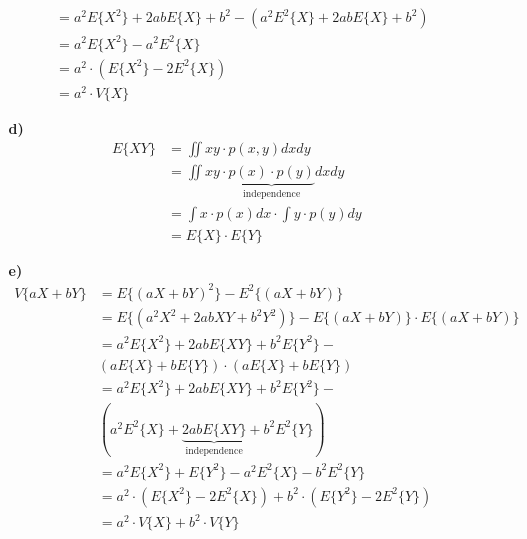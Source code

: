\documentclass[a4paper,11pt]{article}
\begin{document}
\begin{enumerate}
\begin{enumerate}
\begin{align*}
		&= a^2E\lbrace X^2 \rbrace + 2abE\lbrace X \rbrace + b^2 - (a^2E^2\lbrace X \rbrace + 2abE\lbrace X \rbrace + b^2) \\
		&= a^2E\lbrace X^2 \rbrace - a^2E^2\lbrace X \rbrace \\
		&= a^2 \cdot (E\lbrace X^2 \rbrace - 2E^2\lbrace X \rbrace) \\
		&= a^2 \cdot V\lbrace X \rbrace
		\end{align*}
		\item[\textbf{d)}]
		\begin{align*}
		E\lbrace XY \rbrace &= \iint xy \cdot p(x,y) dxdy \\
		&= \iint xy \cdot \underbrace{p(x) \cdot p(y)}_{\text{independence}} dxdy \\
		&= \int x \cdot p(x) dx \cdot \int y \cdot p(y) dy \\
		&= E\lbrace X \rbrace \cdot E\lbrace Y \rbrace
		\end{align*}
		\item[\textbf{e)}]
		\begin{align*}
		V\lbrace aX + bY \rbrace &= E\lbrace (aX + bY)^2 \rbrace - E^2\lbrace (aX + bY) \rbrace \\
		&= E\lbrace (a^2X^2 + 2abXY + b^2Y^2) \rbrace - E\lbrace (aX + bY) \rbrace \cdot
		E\lbrace (aX + bY) \rbrace \\
		&= a^2E\lbrace X^2 \rbrace + 2abE\lbrace XY \rbrace + b^2E\lbrace Y^2 \rbrace - \\ &(aE\lbrace X \rbrace + bE\lbrace Y \rbrace) \cdot (aE\lbrace X \rbrace + bE\lbrace Y \rbrace) \\
		&= a^2E\lbrace X^2 \rbrace + 2abE\lbrace XY \rbrace + b^2E\lbrace Y^2 \rbrace - \\ &(a^2E^2\lbrace X \rbrace + \underbrace{2abE\lbrace XY \rbrace}_{\text{independence}} + b^2E^2\lbrace Y \rbrace) \\
		&= a^2E\lbrace X^2 \rbrace + E\lbrace Y^2 \rbrace - a^2E^2\lbrace X \rbrace - b^2E^2\lbrace Y \rbrace\\
		&= a^2 \cdot (E\lbrace X^2 \rbrace - 2E^2\lbrace X \rbrace) + b^2 \cdot (E\lbrace Y^2 \rbrace - 2E^2\lbrace Y \rbrace) \\
		&= a^2 \cdot V\lbrace X \rbrace + b^2 \cdot V\lbrace Y \rbrace
		\end{align*}
		\end{enumerate}
	\end{enumerate}
\end{document}
